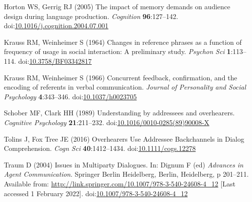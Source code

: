 \documentclass[
  english,
  a4paper,
]{article}
\newlength{\cslhangindent}
\newlength{\cslentryspacingunit} %
\newenvironment{CSLReferences}[2] %
 {%
  \setlength{\parindent}{0pt}
  \ifodd #1
  \let\oldpar\par
  \def\par{\hangindent=\cslhangindent\oldpar}
  \fi
  \setlength{\parskip}{#2\cslentryspacingunit}
 }%
 {}
\begin{document}
\begin{CSLReferences}{1}{0}
\leavevmode{}%
Horton WS, Gerrig RJ (2005) The impact of memory demands on audience design during language production. \emph{Cognition} \textbf{96}:127--142. doi:\href{https://doi.org/10.1016/j.cognition.2004.07.001}{10.1016/j.cognition.2004.07.001}

\leavevmode{}%
Krauss RM, Weinheimer S (1964) Changes in reference phrases as a function of frequency of usage in social interaction: A preliminary study. \emph{Psychon Sci} \textbf{1}:113--114. doi:\href{https://doi.org/10.3758/BF03342817}{10.3758/BF03342817}

\leavevmode{}%
Krauss RM, Weinheimer S (1966) Concurrent feedback, confirmation, and the encoding of referents in verbal communication. \emph{Journal of Personality and Social Psychology} \textbf{4}:343--346. doi:\href{https://doi.org/10.1037/h0023705}{10.1037/h0023705}

\leavevmode{}%
Schober MF, Clark HH (1989) Understanding by addressees and overhearers. \emph{Cognitive Psychology} \textbf{21}:211--232. doi:\href{https://doi.org/10.1016/0010-0285(89)90008-X}{10.1016/0010-0285(89)90008-X}

\leavevmode{}%
Tolins J, Fox Tree JE (2016) Overhearers {Use Addressee Backchannels} in {Dialog Comprehension}. \emph{Cogn Sci} \textbf{40}:1412--1434. doi:\href{https://doi.org/10.1111/cogs.12278}{10.1111/cogs.12278}

\leavevmode{}%
Traum D (2004) Issues in {Multiparty Dialogues}. In: Dignum F (ed) \emph{Advances in {Agent Communication}}. {Springer Berlin Heidelberg}, {Berlin, Heidelberg}, p 201--211. Available from: \url{http://link.springer.com/10.1007/978-3-540-24608-4_12} {[}Last accessed 1 February 2022{]}. doi:\href{https://doi.org/10.1007/978-3-540-24608-4_12}{10.1007/978-3-540-24608-4\_12}

\end{CSLReferences}
\end{document}

